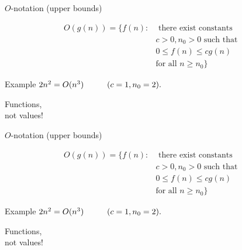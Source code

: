 \documentclass{beamer}
\begin{document}
\begin{frame}{$O$-notation (upper bounds)}
    \begin{tcolorbox}
        \vspace{-3mm}
        \begin{align*}
            O(g(n)) = \{ f(n):  & \text{ there exist constants } \\
                                                   & c > 0, n_0 > 0 \text{ such that } \\
                                                   & 0 \leq f(n) \leq cg(n) \\
                                                   & \text{for all } n \geq n_0\}
        \end{align*}
    \end{tcolorbox}
    \begin{block}{Example}
        $2n^2 = O(n^3) \hspace{10mm} (c = 1, n_0 = 2).$
    \end{block}
    \vspace{10mm}
    Functions, \\not values!
\end{frame}

\begin{frame}{$O$-notation (upper bounds)}
    \begin{tcolorbox}
        \vspace{-3mm}
        \begin{align*}
            O(g(n)) = \{ f(n):  & \text{ there exist constants } \\
                                                   & c > 0, n_0 > 0 \text{ such that } \\
                                                   & 0 \leq f(n) \leq cg(n) \\
                                                   & \text{for all } n \geq n_0\}
        \end{align*}
    \end{tcolorbox}
    \begin{block}{Example}
        $2n^2 = O(n^3) \hspace{10mm} (c = 1, n_0 = 2).$
    \end{block}
    \vspace{10mm}
    Functions, \\not values! 
\end{frame}
\end{document}
